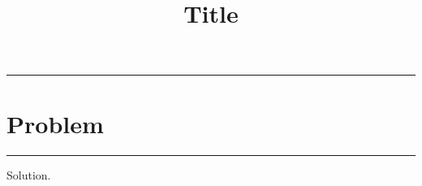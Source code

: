 \documentclass[hidelinks, 11pt, dvipsnames]{article}
\title{Title}
\begin{document}
\maketitle

\begin{center}
    \noindent \rule{17cm}{0.4pt}
        \section*{Problem}
    \noindent \rule{17cm}{0.4pt}
\end{center}

\noindent
Solution.
\end{document}
